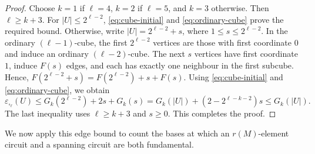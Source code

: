 \documentclass[10pt,a4paper]{article}
\numberwithin{equation}{section}
\begin{document}
\begin{proof}
Choose \(k=1\) if \(\ell=4\), \(k=2\) if \(\ell=5\), and
\(k=3\) otherwise. Then \(\ell\ge k+3\).
For \(|U|\le2^{\ell-2}\), \eqref{eq:cube-initial} and
\eqref{eq:ordinary-cube} prove the required bound.
Otherwise, write \(|U|=2^{\ell-2}+s\), where \(1\le s\le2^{\ell-2}\).
In the ordinary \((\ell-1)\)-cube, the first \(2^{\ell-2}\) vertices
are those with first coordinate \(0\) and induce an ordinary \((\ell-2)\)-cube.
The next \(s\) vertices have first coordinate \(1\), induce \(F(s)\) edges,
and each has exactly one neighbour in the first subcube. Hence,
\(F(2^{\ell-2}+s)=F(2^{\ell-2})+s+F(s)\).
Using \eqref{eq:cube-initial} and \eqref{eq:ordinary-cube}, we obtain
\[
\varepsilon_{\square_\ell}(U)\le G_k(2^{\ell-2})+2s+G_k(s)
=G_k(|U|)+(2-2^{\ell-k-2})s\le G_k(|U|).
\]
The last inequality uses \(\ell\ge k+3\) and \(s\ge0\).
This completes the proof.
\end{proof}


We now apply this edge bound to count the bases at which an
\(r(M)\)-element circuit and a spanning circuit are both fundamental.
\end{document}
